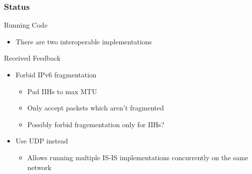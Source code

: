 \documentclass[12pt]{beamer}
\begin{document}
\begin{frame}
  \frametitle{Status}
  \begin{block}{Running Code}
    \begin{itemize}
      \item There are two interoperable implementations
    \end{itemize}
  \end{block}
  \begin{block}{Received Feedback}
    \begin{itemize}
      \item Forbid IPv6 fragmentation
      \begin{itemize}
        \item Pad IIHs to max MTU
        \item Only accept packets which aren't fragmented
        \item Possibly forbid fragementation only for IIHs?
      \end{itemize}
      \item Use UDP instead
      \begin{itemize}
        \item Allows running multiple IS-IS implementations concurrently on the
              same network
      \end{itemize}
    \end{itemize}
  \end{block}
\end{frame}
\end{document}
